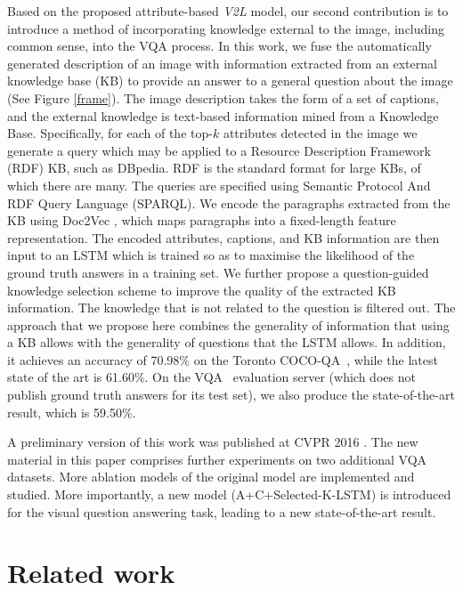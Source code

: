 \documentclass[10pt,journal,compsoc]{IEEEtran}
\def\V2L{\textit{V2L}}
\begin{document}
Based on the proposed attribute-based \textit{\V2L} model,
our second contribution is to introduce 
a method of incorporating knowledge external to the image, including common sense, into the VQA process.
In this work, we fuse the automatically generated description of an image with information extracted from an external
knowledge base (KB) to provide an answer to a general question about the image (See Figure \ref{frame}). The image description takes the form of a set of captions, and the external knowledge is text-based information mined from a Knowledge Base. Specifically, for each of the top-$k$ attributes detected in the image we generate a query which may be applied to a Resource Description Framework (RDF) KB, such as DBpedia.  RDF is the standard format for large KBs, of which there are many.  The queries are specified using Semantic Protocol And RDF Query Language (SPARQL). We encode the paragraphs extracted from the KB using Doc2Vec \cite{le2014distributed}, which maps paragraphs into a fixed-length feature representation. The encoded attributes, captions, and KB information are then input to an LSTM which is trained so as to maximise the likelihood of the ground truth answers in a training set. We further propose a question-guided knowledge selection scheme to improve the quality of  the extracted KB information. The knowledge that is
not related to the question is filtered out. The approach that we propose here combines the generality of information that using a KB allows with the generality of questions that the LSTM allows.
In addition, it achieves an accuracy of 70.98\% on the Toronto COCO-QA~\cite{ren2015image}, while the latest state of the art is 61.60\%. On the VQA~\cite{antol2015vqa} evaluation server (which does not publish ground truth answers for its test set), we also produce the state-of-the-art result, which is 59.50\%.

A preliminary version of this work was published at CVPR 2016 \cite{wu2015image,wu2015ask}. The new material in this paper comprises further experiments on two additional VQA datasets. More ablation models of the original model are implemented and studied. More importantly, a new model (A+C+Selected-K-LSTM) 
is introduced 
for the visual question answering task, leading to a new state-of-the-art result.




 
\section{Related work}
\label{sec:related_work}
\end{document}
